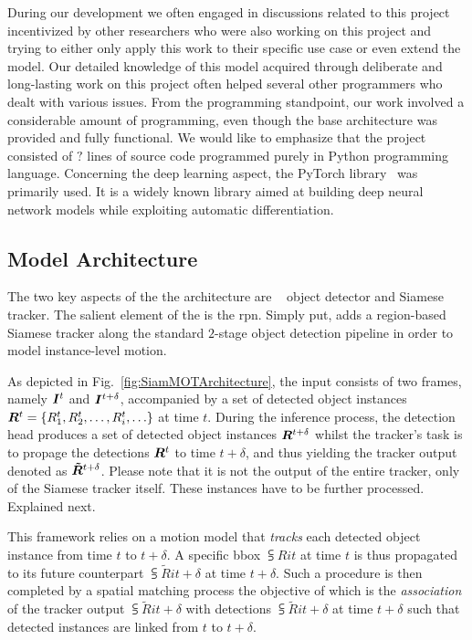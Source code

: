 During our development we often engaged in discussions related to this project incentivized by other researchers who were also working on this project and trying to either only apply this work to their specific use case or even extend the model. Our detailed knowledge of this model acquired through deliberate and long-lasting work on this project often helped several other programmers who dealt with various issues. From the programming standpoint, our work involved a considerable amount of programming, even though the base architecture was provided and fully functional. We would like to emphasize that the project consisted of $?$ lines of source code programmed purely in Python programming language. Concerning the deep learning aspect, the PyTorch library~\cite{paszke2019pytorch} was primarily used. It is a widely known library aimed at building deep neural network models while exploiting automatic differentiation.

\subsection{Model Architecture}

The two key aspects of the the \siammot{} architecture are ~\cite{ren2017fasterrcnn} object detector and Siamese tracker. The salient element of the  is the \gls{rpn}. Simply put, \siammot{} adds a region-based Siamese tracker along the standard $2$-stage object detection pipeline in order to model instance-level motion.

As depicted in Fig.~\ref{fig:SiamMOTArchitecture}, the input consists of two frames, namely $\bm{I}^{t}$ and $\bm{I}^{t + \delta}$, accompanied by a set of detected object instances $\bm{R}^{t} = \left\{ {{R}_{1}^{t}, {R}_{2}^{t}, \dots, {R}_{i}^{t}, \dots} \right\}$ at time $t$. During the inference process, the detection head produces a set of detected object instances $\bm{R}^{t + \delta}$ whilst the tracker's task is to propage the detections $\bm{R}^{t}$ to time $t + \delta$, and thus yielding the tracker output denoted as $\bm{\tilde{R}}^{t + \delta}$. Please note that it is not the output of the entire tracker, only of the Siamese tracker itself. These instances have to be further processed. Explained next.

This framework relies on a motion model that \emph{tracks} each detected object instance from time $t$ to $t + \delta$. A specific \gls{bbox} $\subsup{R}{i}{t}$ at time $t$ is thus propagated to its future counterpart $\subsup{\tilde{R}}{i}{t + \delta}$ at time $t + \delta$. Such a procedure is then completed by a spatial matching process the objective of which is the \emph{association} of the tracker output $\subsup{\tilde{R}}{i}{t + \delta}$ with detections $\subsup{\tilde{R}}{i}{t + \delta}$ at time $t + \delta$ such that detected instances are linked from $t$ to $t + \delta$.

